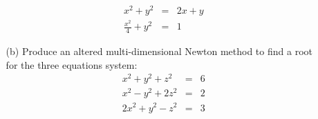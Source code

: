 \documentclass{article}
\begin{document}
\begin{enumerate}
\begin{itemize}
    \begin{eqnarray}
      x^2+y^2&=&2x+y \\
      \frac{x^2}{4}+y^2&=&1      
    \end{eqnarray}
    \item[(b)]  Produce an altered multi-dimensional Newton method to find a root for the three equations system:
    \begin{eqnarray}
      x^2+y^2+z^2&=&6\\
      x^2-y^2+2z^2&=&2\\
      2x^2+y^2-z^2&=&3   
    \end{eqnarray}    
  \end{itemize}
\end{enumerate}
\end{document}
